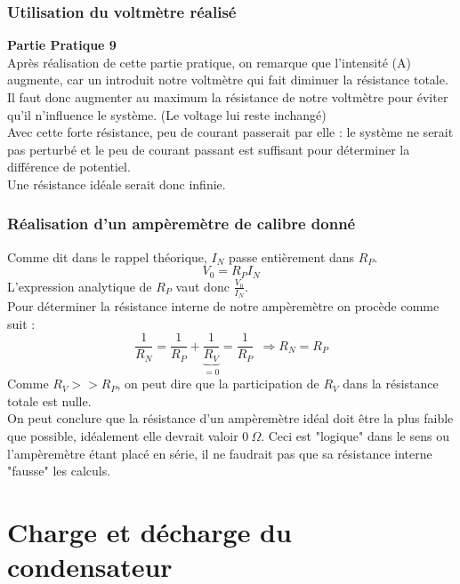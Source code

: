 \documentclass	[11pt, a4paper, openany]{book}
\begin{document}
\subsubsection*{Utilisation du voltmètre réalisé}
\textbf{Partie Pratique 9}\\
Après réalisation de cette partie pratique, on remarque que l'intensité (A) augmente, car un introduit notre voltmètre qui fait diminuer la résistance totale. Il faut donc augmenter au maximum la résistance de notre voltmètre pour éviter qu'il n'influence le système. (Le voltage lui reste inchangé)\\

Avec cette forte résistance, peu de courant passerait par elle : le système ne serait pas perturbé et le peu de courant passant est suffisant pour déterminer la différence de potentiel. \\
Une résistance idéale serait donc infinie.

\subsubsection*{Réalisation d'un ampèremètre de calibre donné}
Comme dit dans le rappel théorique, $I_N$ passe entièrement dans $R_P$.
\begin{equation}
V_0 = R_P I_N
\end{equation}
L'expression analytique de $R_P$ vaut donc $\frac{V_0}{I_N}$.\\

Pour déterminer la résistance interne de notre ampèremètre on procède comme suit : 
\begin{equation}
\frac{1}{R_N} = \frac{1}{R_P} + \underbrace{\frac{1}{R_V}}_{= 0} = \frac{1}{R_P}\ \ \Rightarrow R_N = R_P
\end{equation}
Comme $R_V >> R_P$, on peut dire que la participation de $R_V$ dans la résistance totale est nulle.\\

On peut conclure que la résistance d'un ampèremètre idéal doit être la plus faible que possible, idéalement elle devrait valoir $0\ \Omega$. Ceci est "logique" dans le sens ou l'ampèremètre étant placé en série, il ne faudrait pas que sa résistance interne "fausse" les calculs.







\newpage
\section{Charge et décharge du condensateur}
\end{document}
